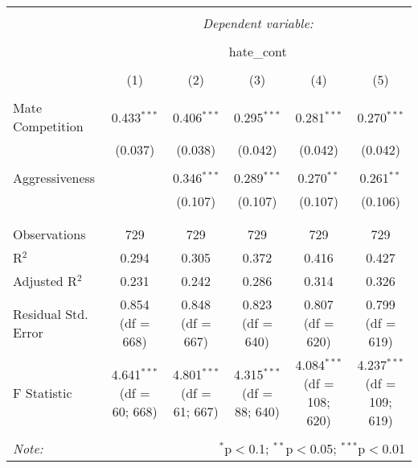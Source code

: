 
\begin{table}[!htbp] \centering 
  \caption{} 
  \label{} 
\begin{tabular}{@{\extracolsep{5pt}}lccccc} 
\\[-1.8ex]\hline 
\hline \\[-1.8ex] 
 & \multicolumn{5}{c}{\textit{Dependent variable:}} \\ 
\cline{2-6} 
\\[-1.8ex] & \multicolumn{5}{c}{hate\_cont} \\ 
\\[-1.8ex] & (1) & (2) & (3) & (4) & (5)\\ 
\hline \\[-1.8ex] 
 Mate Competition & 0.433$^{***}$ & 0.406$^{***}$ & 0.295$^{***}$ & 0.281$^{***}$ & 0.270$^{***}$ \\ 
  & (0.037) & (0.038) & (0.042) & (0.042) & (0.042) \\ 
  & & & & & \\ 
 Aggressiveness &  & 0.346$^{***}$ & 0.289$^{***}$ & 0.270$^{**}$ & 0.261$^{**}$ \\ 
  &  & (0.107) & (0.107) & (0.107) & (0.106) \\ 
  & & & & & \\ 
\hline \\[-1.8ex] 
Observations & 729 & 729 & 729 & 729 & 729 \\ 
R$^{2}$ & 0.294 & 0.305 & 0.372 & 0.416 & 0.427 \\ 
Adjusted R$^{2}$ & 0.231 & 0.242 & 0.286 & 0.314 & 0.326 \\ 
Residual Std. Error & 0.854 (df = 668) & 0.848 (df = 667) & 0.823 (df = 640) & 0.807 (df = 620) & 0.799 (df = 619) \\ 
F Statistic & 4.641$^{***}$ (df = 60; 668) & 4.801$^{***}$ (df = 61; 667) & 4.315$^{***}$ (df = 88; 640) & 4.084$^{***}$ (df = 108; 620) & 4.237$^{***}$ (df = 109; 619) \\ 
\hline 
\hline \\[-1.8ex] 
\textit{Note:}  & \multicolumn{5}{r}{$^{*}$p$<$0.1; $^{**}$p$<$0.05; $^{***}$p$<$0.01} \\ 
\end{tabular} 
\end{table} 
